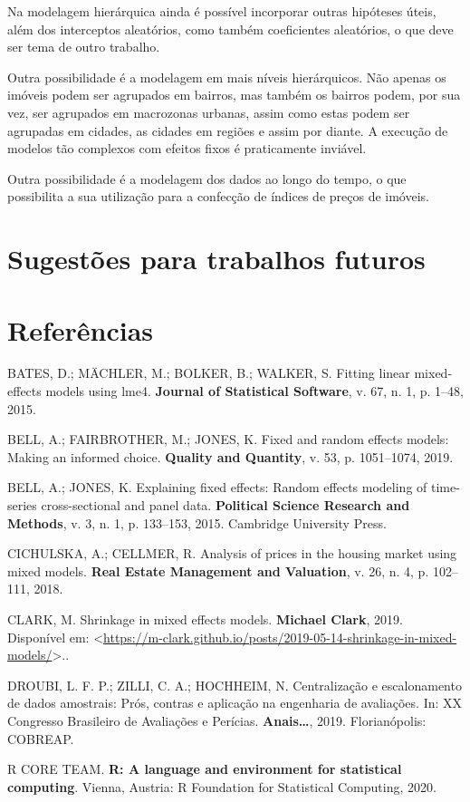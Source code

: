 \documentclass[
  a4paper, 11pt]{article}
\begin{document}
Na modelagem hierárquica ainda é possível incorporar outras hipóteses
úteis, além dos interceptos aleatórios, como também coeficientes
aleatórios, o que deve ser tema de outro trabalho.

Outra possibilidade é a modelagem em mais níveis hierárquicos. Não
apenas os imóveis podem ser agrupados em bairros, mas também os bairros
podem, por sua vez, ser agrupados em macrozonas urbanas, assim como
estas podem ser agrupadas em cidades, as cidades em regiões e assim por
diante. A execução de modelos tão complexos com efeitos fixos é
praticamente inviável.

Outra possibilidade é a modelagem dos dados ao longo do tempo, o que
possibilita a sua utilização para a confecção de índices de preços de
imóveis.

\hypertarget{sugestuxf5es-para-trabalhos-futuros}{%
\section{Sugestões para trabalhos
futuros}\label{sugestuxf5es-para-trabalhos-futuros}}

\hypertarget{referuxeancias}{%
\section*{Referências}\label{referuxeancias}}

\hypertarget{refs}{}
\leavevmode\hypertarget{ref-Bates}{}%
BATES, D.; MÄCHLER, M.; BOLKER, B.; WALKER, S. Fitting linear
mixed-effects models using lme4. \textbf{Journal of Statistical
Software}, v. 67, n. 1, p. 1--48, 2015.

\leavevmode\hypertarget{ref-bell2019}{}%
BELL, A.; FAIRBROTHER, M.; JONES, K. Fixed and random effects models:
Making an informed choice. \textbf{Quality and Quantity}, v. 53, p.
1051--1074, 2019.

\leavevmode\hypertarget{ref-bell2015}{}%
BELL, A.; JONES, K. Explaining fixed effects: Random effects modeling of
time-series cross-sectional and panel data. \textbf{Political Science
Research and Methods}, v. 3, n. 1, p. 133--153, 2015. Cambridge
University Press.

\leavevmode\hypertarget{ref-polonia}{}%
CICHULSKA, A.; CELLMER, R. Analysis of prices in the housing market
using mixed models. \textbf{Real Estate Management and Valuation}, v.
26, n. 4, p. 102--111, 2018.

\leavevmode\hypertarget{ref-clark2019shrinkage}{}%
CLARK, M. Shrinkage in mixed effects models. \textbf{Michael Clark},
2019. Disponível em:
\textless{}\url{https://m-clark.github.io/posts/2019-05-14-shrinkage-in-mixed-models/}\textgreater..

\leavevmode\hypertarget{ref-droubi2019}{}%
DROUBI, L. F. P.; ZILLI, C. A.; HOCHHEIM, N. Centralização e
escalonamento de dados amostrais: Prós, contras e aplicação na
engenharia de avaliações. In: XX Congresso Brasileiro de Avaliações e
Perícias. \textbf{Anais\ldots{}}, 2019. Florianópolis: COBREAP.

\leavevmode\hypertarget{ref-R}{}%
R CORE TEAM. \textbf{R: A language and environment for statistical
computing}. Vienna, Austria: R Foundation for Statistical Computing,
2020.
\end{document}

